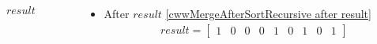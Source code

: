 \begin{frame}[containsverbatim]{\cwwalgortihmexampleframe}
\begin{columns}[c]
\begin{column}{0.45\textwidth}
{\begin{minipage}[c]{\textwidth}
\begin{algorithm}[H]
\begin{algorithmic}[1]
                                            \State \Return $result$
                                        \EndFunction
                                    \end{algorithmic}
                                \end{algorithm}
                            \endgroup
                        \end{minipage}
                    }
                \end{column}

                \begin{column}{0.55\textwidth}
                    \begin{itemize}
                        \item After $result$ \cref{cwwMergeAfterSortRecursive after result}
                        \begin{align*}
                            result = \begin{bmatrix}1 & 0 & 0 & 0 & 1 & 0 & 1 & 0 & 1\end{bmatrix}
                        \end{align*}
                    \end{itemize}
                \end{column}
            \end{columns}
        \end{frame}








            

